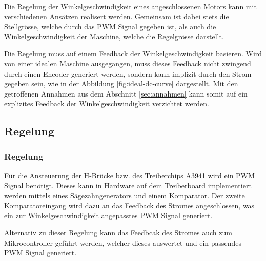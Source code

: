 Die Regelung der Winkelgeschwindigkeit eines angeschlossenen Motors kann
mit verschiedenen Ansätzen realisert werden. Gemeinsam ist dabei stets die
Stellgrösse, welche durch das PWM Signal gegeben ist, als auch die
Winkelgeschwindigkeit der Maschine, welche die Regelgrösse darstellt.

Die Regelung muss auf einem Feedback der Winkelgeschwindigkeit basieren.
Wird von einer idealen Maschine ausgegangen, muss dieses Feedback nicht
zwingend durch einen Encoder generiert werden, sondern kann implizit durch
den Strom gegeben sein, wie in der Abbildung \ref{fig:ideal-dc-curve}
dargestellt. Mit den getroffenen Annahmen aus dem Abschnitt
\ref{sec:annahmen} kann somit auf ein explizites Feedback der
Winkelgeschwindigkeit verzichtet werden. 

\ifSTANDALONE
\subsection{Regelung}
\fi
\ifEMBED
\subsubsection{Regelung}
\fi
Für die Ansteuerung der H-Brücke bzw. des Treiberchips A3941 wird ein PWM
Signal benötigt. Dieses kann in Hardware auf dem Treiberboard implementiert
werden mittels eines Sägezahngenerators und einem Komparator. Der zweite
Komparatoreingang wird dazu an das Feedback des Stromes angeschlossen, was
ein zur Winkelgeschwindigkeit angepasstes PWM Signal generiert.

Alternativ zu dieser Regelung kann das Feedbcak des Stromes auch zum
Mikrocontroller geführt werden, welcher dieses auswertet und ein passendes
PWM Signal generiert.

